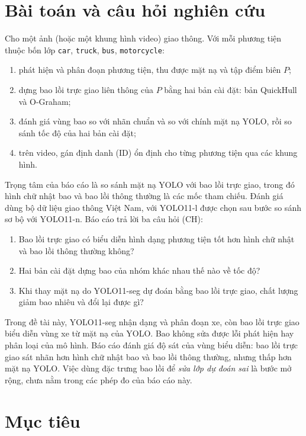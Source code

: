 \section{Bài toán và câu hỏi nghiên cứu}
\label{sec:questions}

Cho một ảnh (hoặc một khung hình video) giao thông. Với mỗi phương tiện thuộc bốn lớp \texttt{car}, \texttt{truck},
\texttt{bus}, \texttt{motorcycle}:
\begin{enumerate}
  \item phát hiện và phân đoạn phương tiện, thu được mặt nạ và tập điểm biên $P$;
  \item dựng bao lồi trực giao liên thông của $P$ bằng hai bản cài đặt: bản QuickHull và O-Graham;
  \item đánh giá vùng bao so với nhãn chuẩn và so với chính mặt nạ YOLO, rồi so sánh tốc độ của hai bản cài đặt;
  \item trên video, gán định danh (ID) ổn định cho từng phương tiện qua các khung hình.
\end{enumerate}

Trọng tâm của báo cáo là so sánh mặt nạ YOLO với bao lồi trực giao, trong đó hình chữ nhật bao và bao lồi thông thường
là các mốc tham chiếu. Đánh giá dùng bộ dữ liệu giao thông Việt Nam, với YOLO11-l được chọn sau bước so sánh sơ bộ với YOLO11-n. Báo cáo trả lời ba câu hỏi (CH):
\begin{enumerate}
  \item[CH1.] Bao lồi trực giao có biểu diễn hình dạng phương tiện tốt hơn hình chữ nhật và bao lồi thông thường không?
  \item[CH2.] Hai bản cài đặt dựng bao của nhóm khác nhau thế nào về tốc độ?
  \item[CH3.] Khi thay mặt nạ do YOLO11-seg dự đoán bằng bao lồi trực giao, chất lượng giảm bao nhiêu và đổi lại được gì?
\end{enumerate}

Trong đề tài này, YOLO11-seg nhận dạng và phân đoạn xe, còn bao lồi trực giao biểu diễn vùng xe từ mặt nạ của YOLO. Bao không sửa được lỗi phát hiện hay phân loại của mô hình.
Báo cáo đánh giá độ sát của vùng biểu diễn: bao lồi trực giao sát nhãn hơn hình chữ nhật bao và bao lồi thông thường, nhưng thấp hơn mặt nạ YOLO.
Việc dùng đặc trưng bao lồi để \emph{sửa lớp dự đoán sai} là bước mở rộng, chưa nằm trong các phép đo của báo cáo này.

\section{Mục tiêu}

